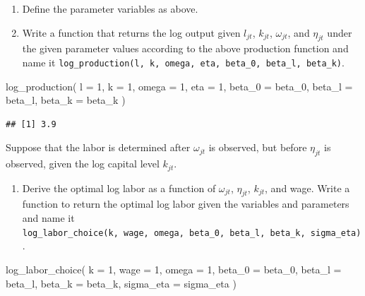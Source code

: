 \documentclass[
]{book}
\newenvironment{Shaded}{\begin{snugshade}}{\end{snugshade}}
\newcommand{\AttributeTok}[1]{\textcolor[rgb]{0.77,0.63,0.00}{#1}}
\newcommand{\DecValTok}[1]{\textcolor[rgb]{0.00,0.00,0.81}{#1}}
\newcommand{\FunctionTok}[1]{\textcolor[rgb]{0.00,0.00,0.00}{#1}}
\newcommand{\NormalTok}[1]{#1}
\providecommand{\tightlist}{%
  \setlength{\itemsep}{0pt}\setlength{\parskip}{0pt}}
\begin{document}
\begin{enumerate}
\def\labelenumi{\arabic{enumi}.}
\item
  Define the parameter variables as above.
\item
  Write a function that returns the log output given \(l_{jt}\), \(k_{jt}\), \(\omega_{jt}\), and \(\eta_{jt}\) under the given parameter values according to the above production function and name it \texttt{log\_production(l,\ k,\ omega,\ eta,\ beta\_0,\ beta\_l,\ beta\_k)}.
\end{enumerate}

\begin{Shaded}
\begin{Highlighting}[]
\FunctionTok{log\_production}\NormalTok{(}
    \AttributeTok{l =} \DecValTok{1}\NormalTok{,}
    \AttributeTok{k =} \DecValTok{1}\NormalTok{,}
    \AttributeTok{omega =} \DecValTok{1}\NormalTok{,}
    \AttributeTok{eta =} \DecValTok{1}\NormalTok{,}
    \AttributeTok{beta\_0 =}\NormalTok{ beta\_0,}
    \AttributeTok{beta\_l =}\NormalTok{ beta\_l,}
    \AttributeTok{beta\_k =}\NormalTok{ beta\_k}
\NormalTok{    ) }
\end{Highlighting}
\end{Shaded}

\begin{verbatim}
## [1] 3.9
\end{verbatim}

Suppose that the labor is determined after \(\omega_{jt}\) is observed, but before \(\eta_{jt}\) is observed, given the log capital level \(k_{jt}\).

\begin{enumerate}
\def\labelenumi{\arabic{enumi}.}
\setcounter{enumi}{2}
\tightlist
\item
  Derive the optimal log labor as a function of \(\omega_{jt}\), \(\eta_{jt}\), \(k_{jt}\), and wage. Write a function to return the optimal log labor given the variables and parameters and name it \texttt{log\_labor\_choice(k,\ wage,\ omega,\ beta\_0,\ beta\_l,\ beta\_k,\ sigma\_eta)}.
\end{enumerate}

\begin{Shaded}
\begin{Highlighting}[]
\FunctionTok{log\_labor\_choice}\NormalTok{(}
  \AttributeTok{k =} \DecValTok{1}\NormalTok{, }
  \AttributeTok{wage =} \DecValTok{1}\NormalTok{, }
  \AttributeTok{omega =} \DecValTok{1}\NormalTok{, }
  \AttributeTok{beta\_0 =}\NormalTok{ beta\_0, }
  \AttributeTok{beta\_l =}\NormalTok{ beta\_l, }
  \AttributeTok{beta\_k =}\NormalTok{ beta\_k, }
  \AttributeTok{sigma\_eta =}\NormalTok{ sigma\_eta}
\NormalTok{  )}
\end{Highlighting}
\end{Shaded}
\end{document}
